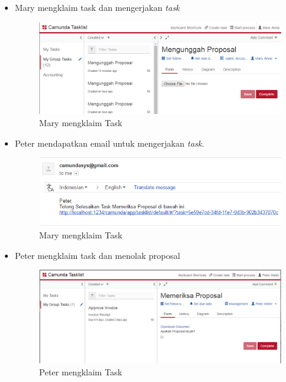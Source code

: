 {\begin{itemize}
	\item Mary mengklaim task dan mengerjakan \textit{task}
		\begin{figure}[H]
			\centering
			\includegraphics[scale=0.5]{Gambar/Bab-5/uji2-6}
			\caption{Mary mengklaim Task} 
			\label{fig:maryklaimtask}
		\end{figure}
	
	\item Peter mendapatkan email untuk mengerjakan \textit{task}.
		\begin{figure}[H]
			\centering
			\includegraphics[scale=0.5]{Gambar/Bab-5/uji2-7}
			\caption{Mary mengklaim Task} 
			\label{fig:maryklaimtask}
		\end{figure}
		
	\item Peter mengklaim task dan menolak proposal
		\begin{figure}[H]
			\centering
			\includegraphics[scale=0.5]{Gambar/Bab-5/uji2-8}
			\caption{Peter mengklaim Task} 
			\label{fig:peterklaimtask}
		\end{figure}
	

\end{itemize}}
